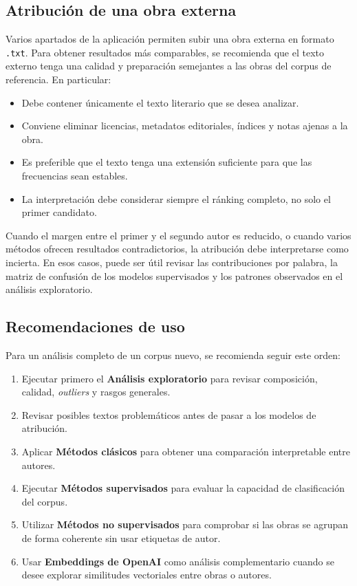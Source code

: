 \documentclass[IB]{TFUOC}%
\begin{document}
\subsection*{Atribución de una obra externa}

Varios apartados de la aplicación permiten subir una obra externa en formato \texttt{.txt}. Para obtener resultados más comparables, se recomienda que el texto externo tenga una calidad y preparación semejantes a las obras del corpus de referencia. En particular:

\begin{itemize}
    \item Debe contener únicamente el texto literario que se desea analizar.
    \item Conviene eliminar licencias, metadatos editoriales, índices y notas ajenas a la obra.
    \item Es preferible que el texto tenga una extensión suficiente para que las frecuencias sean estables.
    \item La interpretación debe considerar siempre el ránking completo, no solo el primer candidato.
\end{itemize}

Cuando el margen entre el primer y el segundo autor es reducido, o cuando varios métodos ofrecen resultados contradictorios, la atribución debe interpretarse como incierta. En esos casos, puede ser útil revisar las contribuciones por palabra, la matriz de confusión de los modelos supervisados y los patrones observados en el análisis exploratorio.

\subsection*{Recomendaciones de uso}

Para un análisis completo de un corpus nuevo, se recomienda seguir este orden:

\begin{enumerate}
    \item Ejecutar primero el \textbf{Análisis exploratorio} para revisar composición, calidad, \textit{outliers} y rasgos generales.
    \item Revisar posibles textos problemáticos antes de pasar a los modelos de atribución.
    \item Aplicar \textbf{Métodos clásicos} para obtener una comparación interpretable entre autores.
    \item Ejecutar \textbf{Métodos supervisados} para evaluar la capacidad de clasificación del corpus.
    \item Utilizar \textbf{Métodos no supervisados} para comprobar si las obras se agrupan de forma coherente sin usar etiquetas de autor.
    \item Usar \textbf{Embeddings de OpenAI} como análisis complementario cuando se desee explorar similitudes vectoriales entre obras o autores.
\end{enumerate}
\end{document}
